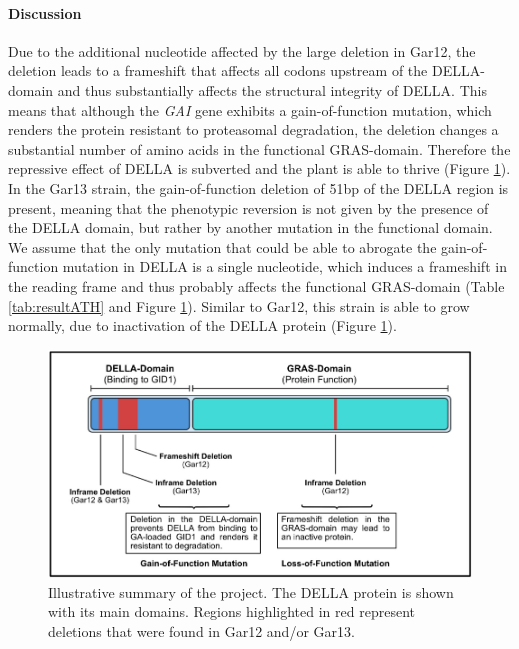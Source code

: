 \documentclass[10pt,a4paper]{article}
\begin{document}
\paragraph{Discussion}

Due to the additional nucleotide affected by the large deletion in Gar12, the deletion leads to a frameshift that affects all codons upstream of the DELLA-domain and thus substantially affects the structural integrity of DELLA. This means that although the \textit{GAI} gene exhibits a gain-of-function mutation, which renders the protein resistant to proteasomal degradation, the deletion changes a substantial number of amino acids in the functional GRAS-domain. Therefore the repressive effect of DELLA is subverted and the plant is able to thrive (Figure \ref{fig:delladomains}).\\


\noindent In the Gar13 strain, the gain-of-function deletion of 51bp of the DELLA region is present, meaning that the phenotypic reversion is not given by the presence of the DELLA domain, but rather by another mutation in the functional domain. We assume that the only mutation that could be able to abrogate the gain-of-function mutation in DELLA is a single nucleotide, which induces a frameshift in the reading frame and thus probably affects the functional GRAS-domain (Table \ref{tab:resultATH} and Figure \ref{fig:delladomains}). Similar to Gar12, this strain is able to grow normally, due to inactivation of the DELLA protein (Figure \ref{fig:delladomains}).


\begin{figure}[H]
	\centering
	\includegraphics[width=0.7\linewidth]{img/DELLAdomains}
	\caption{Illustrative summary of the project. The DELLA protein is shown with its main domains. Regions highlighted in red represent deletions that were found in Gar12 and/or Gar13.}
	\label{fig:delladomains}
\end{figure}
\end{document}
